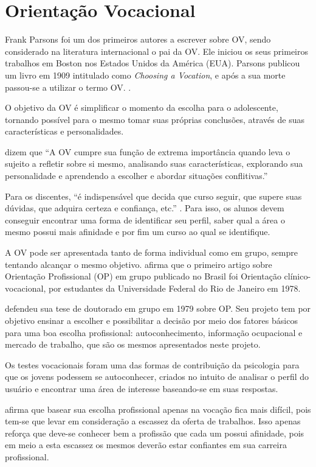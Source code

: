 \documentclass[
	12pt,				%
    oneside,			%
	a4paper,			%
	english,			%
	french,				%
	spanish,			%
	brazil,				%
	]{abntex2}
\begin{document}
\section{Orientação Vocacional}

Frank Parsons foi um dos primeiros autores a escrever sobre OV, sendo considerado na literatura internacional o pai da OV. Ele iniciou os seus primeiros trabalhos em Boston nos Estados Unidos da América (EUA). Parsons publicou um livro em 1909 intitulado como \textit{Choosing a Vocation}, e após a sua morte passou-se a utilizar o termo OV. \cite{frank}.

O objetivo da OV é simplificar o momento da escolha para o adolescente, tornando possível para o mesmo tomar suas próprias conclusões, através de suas características e personalidades. 

 dizem que \enquote{A OV cumpre sua função de extrema importância quando leva o sujeito a refletir sobre si mesmo, analisando suas características, explorando sua personalidade e aprendendo a escolher e abordar situações conflitivas.}

Para os discentes, \enquote{é indispensável que decida que curso seguir, que supere suas dúvidas, que adquira certeza e confiança, etc.} \cite{courel}. Para isso, os alunos devem conseguir encontrar uma forma de identificar seu perfil, saber qual a área o mesmo possui mais afinidade e por fim um curso ao qual se identifique.

A OV pode ser apresentada tanto de forma individual como em grupo, sempre tentando alcançar o mesmo objetivo.  afirma que o primeiro artigo sobre Orientação Profissional (OP) em grupo publicado no Brasil foi Orientação clínico-vocacional, por estudantes da Universidade Federal do Rio de Janeiro em 1978.

 defendeu sua tese de doutorado em grupo em 1979 sobre OP. Seu projeto tem por objetivo ensinar a escolher e possibilitar a decisão por meio dos fatores básicos para uma boa escolha profissional: autoconhecimento, informação ocupacional e mercado de trabalho, que são os mesmos apresentados neste projeto. 

Os testes vocacionais foram uma das formas de contribuição da psicologia para que os jovens podessem se autoconhecer, criados no intuito de analisar o perfil do usuário e encontrar uma área de interesse baseando-se em suas respostas.

 afirma que basear sua escolha profissional apenas na vocação fica mais difícil, pois tem-se que levar em consideração a escassez da oferta de trabalhos. Isso apenas reforça que deve-se conhecer bem a profissão que cada um possui afinidade, pois em meio a esta escassez os mesmos deverão estar confiantes em sua carreira profissional.
\end{document}
